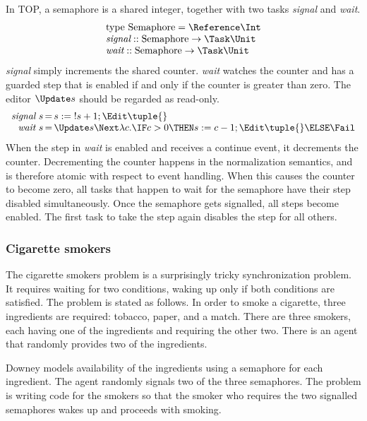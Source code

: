 In TOP, a semaphore is a shared integer, together with two tasks \emph{signal} and \emph{wait}.
\begin{equation*}
  \begin{array}{l}
  \text{type}\ \text{Semaphore} = \Reference \Int \\
  \textit{signal} :: \text{Semaphore} \to \Task \Unit \\
  \textit{wait}   :: \text{Semaphore} \to \Task \Unit
  \end{array}
\end{equation*}
\emph{signal} simply increments the shared counter.
\emph{wait} watches the counter and has a guarded step that is enabled if and only if the counter is greater than zero.
The editor $\Update s$ should be regarded as read-only.
\begin{equation*}
  \begin{array}{r @{\,} c @{\,} l}
    \textit{signal}\ s & = & s := {!s} + 1; \Edit \tuple{} \\
    \textit{wait}\ s   & = & \Update s \Next \lambda c. \IF c > 0 \THEN s := c - 1; \Edit \tuple{} \ELSE \Fail
  \end{array}
\end{equation*}
When the step in \emph{wait} is enabled and receives a continue event, it decrements the counter.
Decrementing the counter happens in the normalization semantics, and is therefore atomic with respect to event handling.
When this causes the counter to become zero, all tasks that happen to wait for the semaphore have their step disabled simultaneously.
Once the semaphore gets signalled, all steps become enabled.
The first task to take the step again disables the step for all others.


\subsubsection{Cigarette smokers}

The cigarette smokers problem \cite{books/Downey08LBOS} is a surprisingly tricky synchronization problem.
It requires waiting for two conditions, waking up only if both conditions are satisfied.
The problem is stated as follows.
In order to smoke a cigarette, three ingredients are required: tobacco, paper, and a match.
There are three smokers, each having one of the ingredients and requiring the other two.
There is an agent that randomly provides two of the ingredients.

Downey models availability of the ingredients using a semaphore for each ingredient.
The agent randomly signals two of the three semaphores.
The problem is writing code for the smokers so that the smoker who requires the two signalled semaphores wakes up and proceeds with smoking.

